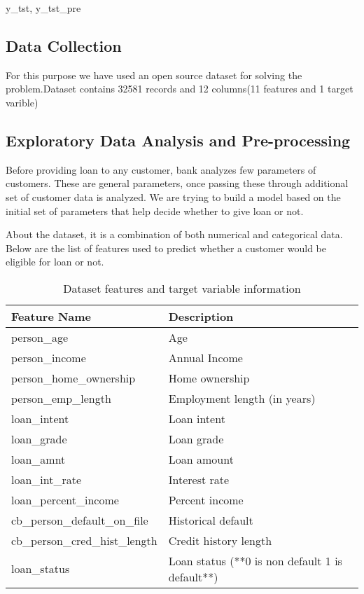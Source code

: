 y_tst, y_tst_pre\documentclass[12pt]{article}
\begin{document}
\subsection{Data Collection}

For this purpose we have used an open source dataset for solving the problem.Dataset contains 32581 records and 12 columns(11 features and 1 target varible)



\subsection{Exploratory Data Analysis and Pre-processing}
Before providing loan to any customer, bank analyzes few parameters of customers. These are general parameters, once passing these through additional set of customer data is analyzed. We are trying to build a model based on the initial set of parameters that help decide whether to give loan or not.

About the dataset, it is a combination of both numerical and categorical data. Below are the list of features used to predict whether a customer would be eligible for loan or not.



\begin{table}[!ht]
    \centering
    \begin{tabular}{|l|l|}
    \hline
        Feature Name & Description \\ \hline
        person\_age & Age \\ \hline
        person\_income & Annual Income \\ \hline
        person\_home\_ownership & Home ownership \\ \hline
        person\_emp\_length & Employment length (in years) \\ \hline
        loan\_intent & Loan intent \\ \hline
        loan\_grade & Loan grade \\ \hline
        loan\_amnt & Loan amount \\ \hline
        loan\_int\_rate & Interest rate \\ \hline
        loan\_percent\_income & Percent income \\ \hline
        cb\_person\_default\_on\_file & Historical default \\ \hline
        cb\_person\_cred\_hist\_length & Credit history length \\ \hline
        loan\_status & Loan status (**0 is non default 1 is default**) \\ \hline
    \end{tabular}
    \caption{Dataset features and target variable information}
\end{table}
\end{document}
